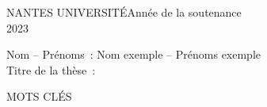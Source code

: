\thispagestyle{empty}
NANTES UNIVERSITÉ\hfill Année de la soutenance\\
\mbox{}\hfill2023
\vspace{0.5cm}
\vspace{0.1cm}
\par Nom -- Prénoms~: Nom exemple -- Prénoms exemple\\
Titre de la thèse~: \g{\thetitle} 
\vspace{0.5cm}
\vspace{0.1cm}

\vspace{0.5cm}
\vspace{0.1cm}
MOTS CLÉS\\
\vfill
